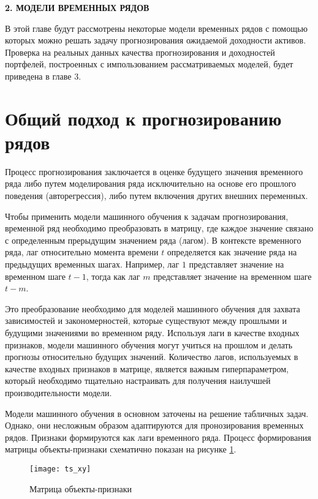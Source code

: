 \newpage
\begin{center}
	\textbf{\large 2. МОДЕЛИ ВРЕМЕННЫХ РЯДОВ}
\end{center}

В этой главе будут рассмотрены некоторые модели временных рядов
с помощью которых можно решать задачу прогнозирования ожидаемой доходности активов.
Проверка на реальных данных качества прогнозирования и доходностей портфелей, 
построенных с импользованием рассматриваемых моделей, будет приведена в главе 3.


\section{Общий подход к прогнозированию рядов}

Процесс прогнозирования заключается в оценке будущего значения временного ряда либо путем 
моделирования ряда исключительно на основе его прошлого поведения (авторегрессия), либо путем включения других внешних переменных.

Чтобы применить модели машинного обучения к задачам прогнозирования, временной ряд необходимо преобразовать в матрицу, 
где каждое значение связано с определенным прерыдущим значением ряда (лагом). 
В контексте временного ряда, лаг относительно момента времени $t$ определяется как значение ряда на предыдущих временных шагах. 
Например, лаг $1$ представляет значение на временном шаге $t-1$, тогда как лаг $m$ представляет значение на временном шаге $t-m$. 

Это преобразование необходимо для моделей машинного обучения для захвата зависимостей и закономерностей, которые существуют 
между прошлыми и будущими значениями во временном ряду. Используя лаги в качестве входных признаков, модели машинного 
обучения могут учиться на прошлом и делать прогнозы относительно будущих значений. Количество лагов, используемых в качестве 
входных признаков в матрице, является важным гиперпараметром, который необходимо тщательно настраивать для получения наилучшей 
производительности модели.

Модели машинного обучения в основном заточены на решение табличных задач. Однако, они несложным образом адаптируются 
для пронозирования временных рядов.
Признаки формируются как лаги временного ряда. Процесс формирования матрицы объекты-признаки схематично
показан на рисунке \ref{fig:feature_matrix}.

\begin{figure}[H]
	\texttt{[image: ts\_xy]}
	\caption{Матрица объекты-признаки}
	\label{fig:feature_matrix}
\end{figure}

